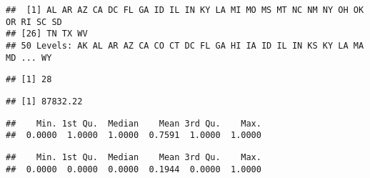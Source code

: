 \documentclass[
]{article}
\newenvironment{Shaded}{\begin{snugshade}}{\end{snugshade}}
\newcommand{\KeywordTok}[1]{\textcolor[rgb]{0.13,0.29,0.53}{\textbf{#1}}}
\newcommand{\NormalTok}[1]{#1}
\newcommand{\OperatorTok}[1]{\textcolor[rgb]{0.81,0.36,0.00}{\textbf{#1}}}
\begin{document}
\begin{verbatim}
##  [1] AL AR AZ CA DC FL GA ID IL IN KY LA MI MO MS MT NC NM NY OH OK OR RI SC SD
## [26] TN TX WV
## 50 Levels: AK AL AR AZ CA CO CT DC FL GA HI IA ID IL IN KS KY LA MA MD ... WY
\end{verbatim}

\begin{Shaded}
\end{Shaded}

\begin{verbatim}
## [1] 28
\end{verbatim}

\begin{Shaded}
\end{Shaded}

\begin{verbatim}
## [1] 87832.22
\end{verbatim}

\begin{Shaded}
\end{Shaded}

\begin{verbatim}
##    Min. 1st Qu.  Median    Mean 3rd Qu.    Max. 
##  0.0000  1.0000  1.0000  0.7591  1.0000  1.0000
\end{verbatim}

\begin{Shaded}
\end{Shaded}

\begin{verbatim}
##    Min. 1st Qu.  Median    Mean 3rd Qu.    Max. 
##  0.0000  0.0000  0.0000  0.1944  0.0000  1.0000
\end{verbatim}
\end{document}
